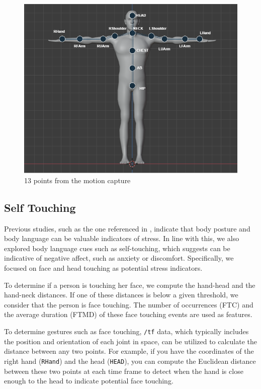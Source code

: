 \begin{figure}[h]
	\centering
	\includegraphics[width=0.8\columnwidth]{images/human.png}
	\caption{13 points from the motion capture} 
	\label{fig:human}
\end{figure}


\subsection*{Self Touching} 
Previous studies, such as the one referenced in \textcite{10.1371/journal.pone.0043571}, indicate that body posture and body language can be valuable indicators of stress. In line with this, we also explored body language cues such as self-touching, which \textcite{HARRIGAN19851161}suggests can be indicative of negative affect, such as anxiety or discomfort. Specifically, we focused on face and head touching as potential stress indicators.

To determine if a person is touching her face, we compute the hand-head and the hand-neck distances. If one of these distances is below a given threshold, we consider that the person is face touching. The number of occurrences (FTC) and the average duration (FTMD) of these face touching events are used as features. 

To determine gestures such as face touching, \texttt{/tf} data, which typically includes the position and orientation of each joint in space, can be utilized to calculate the distance between any two points. For example, if you have the coordinates of the right hand (\texttt{RHand}) and the head (\texttt{HEAD}), you can compute the Euclidean distance between these two points at each time frame to detect when the hand is close enough to the head to indicate potential face touching.

